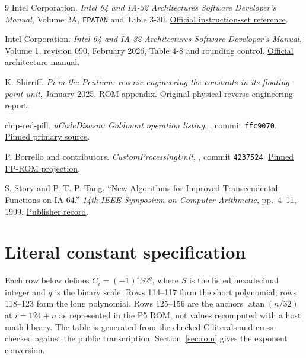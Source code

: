 \documentclass[11pt]{article}
\newcommand{\insn}[1]{\texttt{#1}}
\newcommand{\hex}[1]{\texttt{#1}}
\begin{document}
\begin{thebibliography}{9}
 Intel Corporation.
\emph{Intel 64 and IA-32 Architectures Software Developer's Manual},
Volume 2A, \insn{FPATAN} and Table 3-30.
\href{https://www.intel.com/content/dam/www/public/us/en/documents/manuals/64-ia-32-architectures-software-developer-vol-2a-manual.pdf}{Official instruction-set reference}.

 Intel Corporation.
\emph{Intel 64 and IA-32 Architectures Software Developer's Manual},
Volume 1, revision 090, February 2026, Table 4-8 and rounding control.
\href{https://cdrdv2-public.intel.com/874241/253665-090-sdm-vol-1.pdf}{Official architecture manual}.

 K. Shirriff.
\emph{Pi in the Pentium: reverse-engineering the constants in its
floating-point unit}, January 2025, ROM appendix.
\href{https://www.righto.com/2025/01/pentium-floating-point-ROM.html}{Original physical reverse-engineering report}.

 chip-red-pill.
\emph{uCodeDisasm: Goldmont operation listing},
, commit \hex{ffc9070}.
\href{https://github.com/chip-red-pill/uCodeDisasm/blob/ffc9070233a6e7a26dbabe723289259f087ee20b/ucode/ucode_glm.txt}{Pinned primary source}.

 P. Borrello and contributors.
\emph{CustomProcessingUnit}, ,
commit \hex{4237524}.
\href{https://github.com/pietroborrello/CustomProcessingUnit/blob/4237524fe7545c66e42dd986113f220662c06f6a/bios/dumps/rom.txt}{Pinned FP-ROM projection}.

 S. Story and P. T. P. Tang.
``New Algorithms for Improved Transcendental Functions on IA-64.''
\emph{14th IEEE Symposium on Computer Arithmetic}, pp.~4--11, 1999.
\href{https://doi.org/10.1109/ARITH.1999.762822}{Publisher record}.
\end{thebibliography}

\clearpage
\appendix
\section{Literal constant specification}
\label{app:constants}

Each row below defines $C_i=(-1)^s S2^q$, where $S$ is the listed
hexadecimal integer and $q$ is the binary scale. Rows 114--117 form the
short polynomial; rows 118--123 form the long polynomial. Rows 125--156
are the anchors $\operatorname{atan}(n/32)$ at $i=124+n$ as represented in
the P5 ROM, not values recomputed with a host math library. The table is
generated from the checked C literals and cross-checked against the public
transcription; Section~\ref{sec:rom} gives the exponent conversion.
\end{document}
